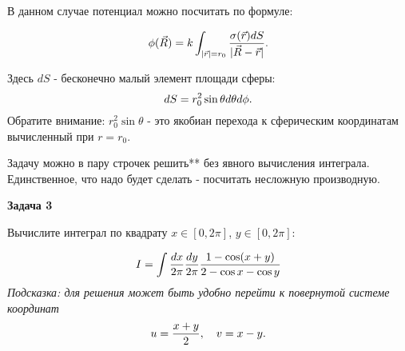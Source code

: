 \documentclass[a4paper,12pt]{article}
\begin{document}
\noindent В данном случае потенциал можно посчитать по формуле:

\begin{equation}\notag
\phi(\vec{R})	=k\int_{|\vec{r}|=r_{0}}\frac{\sigma(\vec{r})dS}{|\vec{R}-\vec{r}|}\text{.}
\end{equation}

\noindent Здесь $dS$ - бесконечно малый элемент площади сферы: 
\begin{equation}
\notag
dS	=r_{0}^{2}\sin\theta d\theta d\phi\text{.}
\end{equation}
\noindent Обратите внимание: $r_{0}^{2}\sin\theta$ - это якобиан перехода к сферическим координатам вычисленный при $r=r_{0}$.

\noindent Задачу можно в пару строчек решить** без явного вычисления интеграла. Единственное, что надо будет сделать - посчитать несложную производную.

\vspace{15pt}
\noindent \textbf{Задача 3}

\noindent Вычислите интеграл по квадрату $x\in[0,2\pi]$, $y\in[0,2\pi]$:

\begin{equation}\notag
I	=\int\frac{dx}{2\pi}\frac{dy}{2\pi}\frac{1-\cos(x+y)}{2-\cos x-\cos y}
\end{equation}
\noindent \textit{Подсказка: для решения может быть удобно перейти к повернутой системе координат}
\begin{equation}\notag
u	=\frac{x+y}{2},\quad v=x-y.
\end{equation}
\end{document}
